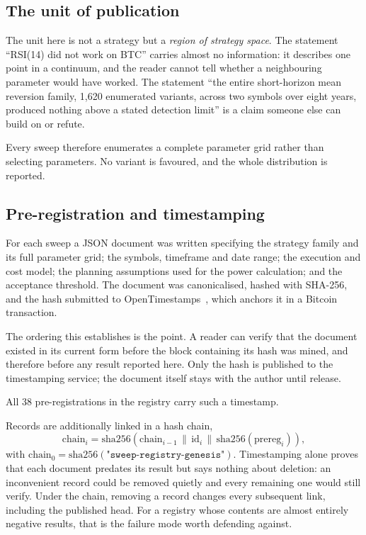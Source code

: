 \documentclass[11pt,a4paper]{article}
\begin{document}
\subsection{The unit of publication}

The unit here is not a strategy but a \emph{region of strategy space}. The
statement ``RSI(14) did not work on BTC'' carries almost no information: it
describes one point in a continuum, and the reader cannot tell whether a
neighbouring parameter would have worked. The statement ``the entire
short-horizon mean reversion family, 1{,}620 enumerated variants, across two
symbols over eight years, produced nothing above a stated detection limit'' is
a claim someone else can build on or refute.

Every sweep therefore enumerates a complete parameter grid rather than
selecting parameters. No variant is favoured, and the whole distribution is
reported.

\subsection{Pre-registration and timestamping}

For each sweep a JSON document was written specifying the strategy family and
its full parameter grid; the symbols, timeframe and date range; the execution
and cost model; the planning assumptions used for the power calculation; and
the acceptance threshold. The document was canonicalised, hashed with
SHA-256, and the hash submitted to OpenTimestamps~\citep{ots}, which anchors
it in a Bitcoin transaction.

The ordering this establishes is the point. A reader can verify that the
document existed in its current form before the block containing its hash was
mined, and therefore before any result reported here. Only the hash is
published to the timestamping service; the document itself stays with the
author until release.

All 38 pre-registrations in the registry carry such a timestamp.

Records are additionally linked in a hash chain,
\begin{equation*}
\mathrm{chain}_i = \mathrm{sha256}\!\left(\mathrm{chain}_{i-1} \,\|\,
\mathrm{id}_i \,\|\, \mathrm{sha256}(\mathrm{prereg}_i)\right),
\end{equation*}
with $\mathrm{chain}_0 = \mathrm{sha256}(\texttt{"sweep-registry-genesis"})$.
Timestamping alone proves that each document predates its result but says
nothing about deletion: an inconvenient record could be removed quietly and
every remaining one would still verify. Under the chain, removing a record
changes every subsequent link, including the published head. For a registry
whose contents are almost entirely negative results, that is the failure mode
worth defending against.
\end{document}
